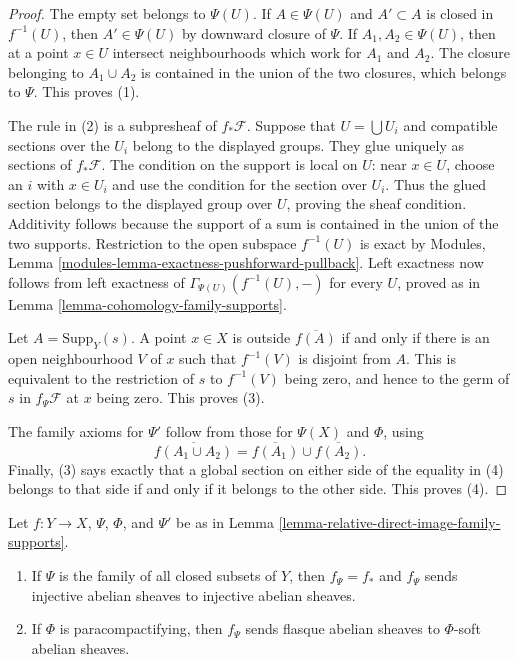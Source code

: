 \begin{proof}
The empty set belongs to $\Psi(U)$. If $A \in \Psi(U)$ and $A' \subset A$
is closed in $f^{-1}(U)$, then $A' \in \Psi(U)$ by downward closure of
$\Psi$. If $A_1,A_2 \in \Psi(U)$, then at a point $x \in U$ intersect
neighbourhoods which work for $A_1$ and $A_2$. The closure belonging to
$A_1 \cup A_2$ is contained in the union of the two closures, which belongs
to $\Psi$. This proves (1).

The rule in (2) is a subpresheaf of $f_*\mathcal{F}$. Suppose that
$U=\bigcup U_i$ and compatible sections over the $U_i$ belong to the
displayed groups. They glue uniquely as sections of $f_*\mathcal{F}$. The
condition on the support is local on $U$: near $x \in U$, choose an $i$ with
$x \in U_i$ and use the condition for the section over $U_i$. Thus the
glued section belongs to the displayed group over $U$, proving the sheaf
condition. Additivity follows because the support of a sum is contained in
the union of the two supports. Restriction to the open subspace $f^{-1}(U)$
is exact by Modules, Lemma
\ref{modules-lemma-exactness-pushforward-pullback}. Left exactness now
follows from left exactness of
$\Gamma_{\Psi(U)}(f^{-1}(U),-)$ for every $U$, proved as in Lemma
\ref{lemma-cohomology-family-supports}.

Let $A=\text{Supp}_Y(s)$. A point $x \in X$ is outside
$\overline{f(A)}$ if and only if there is an open neighbourhood $V$ of $x$
such that $f^{-1}(V)$ is disjoint from $A$. This is equivalent to the
restriction of $s$ to $f^{-1}(V)$ being zero, and hence to the germ of $s$
in $f_\Psi\mathcal{F}$ at $x$ being zero. This proves (3).

The family axioms for $\Psi'$ follow from those for $\Psi(X)$ and $\Phi$,
using
$$
\overline{f(A_1 \cup A_2)}
= \overline{f(A_1)} \cup \overline{f(A_2)}.
$$
Finally, (3) says exactly that a global section on either side of the
equality in (4) belongs to that side if and only if it belongs to the
other side. This proves (4).
\end{proof}

\begin{lemma}
\label{lemma-relative-direct-image-acyclic}
\begin{reference}
\cite[Chapter III, \S 3.7, Lemma 3.7.1, pp. 172--173]{Tohoku}
\end{reference}
Let $f : Y \to X$, $\Psi$, $\Phi$, and $\Psi'$ be as in Lemma
\ref{lemma-relative-direct-image-family-supports}.
\begin{enumerate}
\item If $\Psi$ is the family of all closed subsets of $Y$, then
$f_\Psi=f_*$ and $f_\Psi$ sends injective abelian sheaves to injective
abelian sheaves.
\item If $\Phi$ is paracompactifying, then $f_\Psi$ sends flasque abelian
sheaves to $\Phi$-soft abelian sheaves.
\end{enumerate}
\end{lemma}

